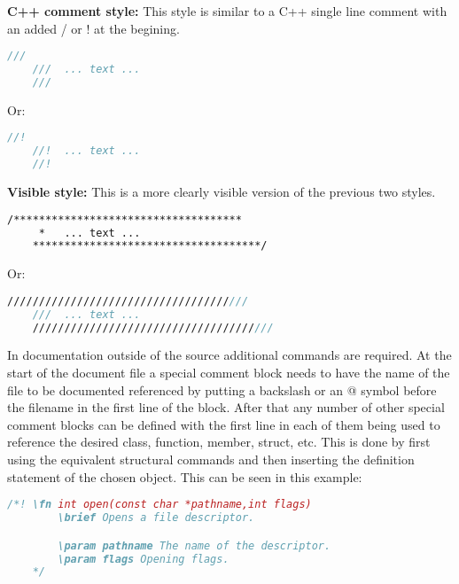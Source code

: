 \vspace{\baselineskip}
\textbf{C++ comment style:} This style is similar to a C++ single line comment with an added / or ! at the begining.

\begin{minipage}{\textwidth}
\begin{lstlisting}[language=Doxygen]
    ///
    ///  ... text ...
    ///
\end{lstlisting}
Or:
\begin{lstlisting}[language=Doxygen]
    //!
    //!  ... text ...
    //!
\end{lstlisting}
\end{minipage}

\vspace{\baselineskip}
\textbf{Visible style:} This is a more clearly visible version of the previous two styles.

\begin{minipage}{\textwidth}
\begin{lstlisting}[language=Doxygen]
    /************************************
     *   ... text ...
    ************************************/
\end{lstlisting}
Or:
\begin{lstlisting}[language=Doxygen]
    //////////////////////////////////////
    ///  ... text ...
    //////////////////////////////////////
\end{lstlisting}
\end{minipage}

\vspace{\baselineskip}

In documentation outside of the source additional commands are required. At the start of the document file a special comment block needs to have the name of the
file to be documented referenced by putting a backslash or an @ symbol before the filename in the first line of the block. After that any number of other 
special comment blocks can be defined with the first line in each of them being used to reference the desired class, function, member, struct, etc. This is done by
first using the equivalent structural commands and then inserting the definition statement of the chosen object. This can be seen in this example:\\

\begin{minipage}{\textwidth}
\begin{lstlisting}[language=Doxygen]
    /*! \fn int open(const char *pathname,int flags)
        \brief Opens a file descriptor.

        \param pathname The name of the descriptor.
        \param flags Opening flags.
    */
\end{lstlisting}
\end{minipage}

